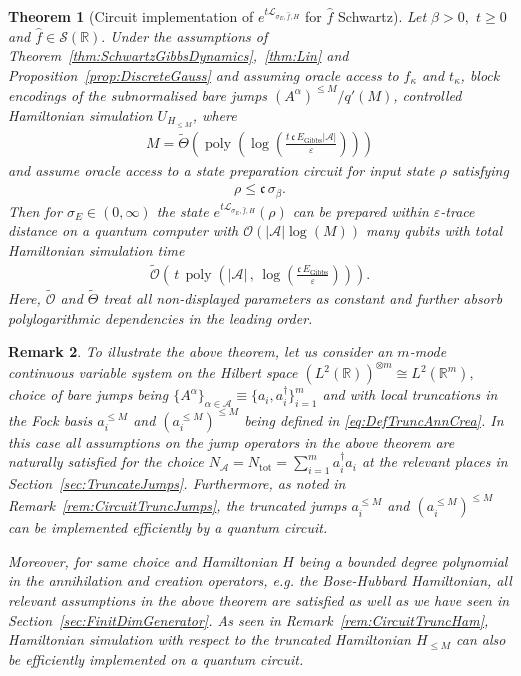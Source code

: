 \documentclass[11pt]{amsart}
\newcommand{\1}{\mathbbm{1}}
\newcommand{\R}{\mathbb{R}}
\newcommand{\cL}{\mathcal{L}}
\newcommand{\eps}{\varepsilon}
\newcommand{\NA}{N_{\mathcal{A}}}
\renewcommand{\epsilon}{\varepsilon}
\newcommand{\cA}{\mathcal{A}}
\theoremstyle{plain}
\newtheorem{theorem}{Theorem}[section]
\newtheorem{remark}[theorem]{Remark}
\theoremstyle{definition}
\theoremstyle{remark}
\numberwithin{equation}{section}
\begin{document}
\begin{theorem}[Circuit implementation of $e^{t\cL_{\sigma_E,\widehat f,H}}$ for $\widehat f$ Schwartz]
\label{thm:CircuitDynamicsSchwartz}
Let $\beta>0,$ $t\ge 0$ and $\widehat f\in\mathcal{S}(\R).$
 Under the assumptions of Theorem~\ref{thm:SchwartzGibbsDynamics},~\ref{thm:Lin} and  Proposition~\ref{prop:DiscreteGauss} and assuming oracle access to ${f}_\kappa$ and  $t_\kappa$, block encodings of the subnormalised bare jumps $(A^{\alpha})^{\le M}/q'(M)$, controlled Hamiltonian simulation $U_{H_{\le M}}$, where 
\begin{align}
\label{eq:MDimension}
 M =\widetilde\Theta\left(\operatorname{poly}\left(\log\left(\frac{t\,\mathfrak{c}\,E_{\operatorname{Gibbs}}|\cA|}{ \eps}\right)\right)\right)
    \end{align}
    and assume oracle access to a state preparation circuit for input state $\rho$ satisfying
    \begin{align*}
        \rho \le \mathfrak{c}\, \sigma_\beta.
    \end{align*}
Then for $\sigma_E\in(0,\infty)$ the state $e^{t\cL_{\sigma_E,\widehat f, H}}(\rho)$ can be prepared within $\eps$-trace distance on a quantum computer with $\mathcal{O}\left(|\cA|\log(M)\right)$ many qubits with total Hamiltonian simulation time 
    \begin{align*}
\widetilde{\mathcal{O}}\left( \,t\,\operatorname{poly}\left(|\mathcal{A}|\,,\, \log\left(\frac{\mathfrak{c}\,E_{\operatorname{Gibbs}}}{\epsilon}\right)\right)\right).
    \end{align*} 
Here, $\widetilde{\mathcal{O}}$ and $\widetilde\Theta$ treat all non-displayed parameters as constant
and further absorb  polylogarithmic dependencies in the leading order.
\end{theorem}
\begin{remark}
To illustrate the above theorem, let us consider an $m$-mode continuous variable system on the Hilbert space $(L^2(\R))^{\otimes m} \cong L^2(\R^m),$ choice of bare jumps being $\{A^\alpha\}_{\alpha\in\cA} \equiv \{a_i,a^\dagger_i\}_{i=1}^m$ and with local truncations in the Fock basis $a^{\le M}_i$ and $(a^{\le M}_i)^{\le M}$ being defined in \eqref{eq:DefTruncAnnCrea}. In this case all assumptions on the jump operators in the above theorem are naturally satisfied for the choice $\NA = N_{\operatorname{tot}} = \sum_{i=1}^m a^\dagger_ia_i$ at the relevant places in Section~\ref{sec:TruncateJumps}.
Furthermore, as noted in Remark~\ref{rem:CircuitTruncJumps}, the truncated jumps $a^{\le M}_i$ and $(a^{\le M}_i)^{\le M}$ can be implemented efficiently by a quantum circuit.

Moreover, for same choice and Hamiltonian $H$ being a bounded degree polynomial in the annihilation and creation operators, e.g. the Bose-Hubbard Hamiltonian, all relevant assumptions in the above theorem are satisfied as well as we have seen in Section~\ref{sec:FinitDimGenerator}. As seen in Remark~\ref{rem:CircuitTruncHam}, Hamiltonian simulation with respect to the truncated Hamiltonian $H_{\le M}$ can also be efficiently implemented on a quantum circuit.
\end{remark}
\end{document}
